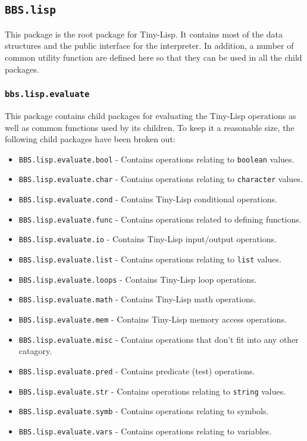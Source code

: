 \documentclass[10pt, openany]{book}
\newcommand{\package}[1]{\texttt{#1}}
\newcommand{\datatype}[1]{\texttt{#1}}
\newcommand{\tl}{Tiny-Lisp}
\begin{document}
\subsection{\package{BBS.lisp}}
This package is the root package for \tl{}.  It contains most of the data structures and the public interface for the interpreter.  In addition, a number of common utility function are defined here so that they can be used in all the child packages.

\subsubsection{\package{bbs.lisp.evaluate}}
This package contains child packages for evaluating the \tl{} operations as well as common functions used by its children.  To keep it a reasonable size, the following child packages have been broken out:
\begin{itemize}
  \item \package{BBS.lisp.evaluate.bool} - Contains operations relating to \datatype{boolean} values.
  \item \package{BBS.lisp.evaluate.char} - Contains operations relating to \datatype{character} values.
  \item \package{BBS.lisp.evaluate.cond} - Contains \tl{} conditional operations.
  \item \package{BBS.lisp.evaluate.func} - Contains operations related to defining functions.
  \item \package{BBS.lisp.evaluate.io} - Contains \tl{} input/output operations.
  \item \package{BBS.lisp.evaluate.list} - Contains operations relating to \datatype{list} values.
  \item \package{BBS.lisp.evaluate.loops} - Contains \tl{} loop operations.
  \item \package{BBS.lisp.evaluate.math} - Contains \tl{} math operations.
  \item \package{BBS.lisp.evaluate.mem} - Contains \tl{} memory access operations.
  \item \package{BBS.lisp.evaluate.misc} - Contains operations that don't fit into any other catagory.
  \item \package{BBS.lisp.evaluate.pred} - Contains predicate (test) operations.
  \item \package{BBS.lisp.evaluate.str} - Contains operations relating to \datatype{string} values.
  \item \package{BBS.lisp.evaluate.symb} - Contains operations relating to symbols.
  \item \package{BBS.lisp.evaluate.vars} - Contains operations relating to variables.
\end{itemize}
\end{document}
